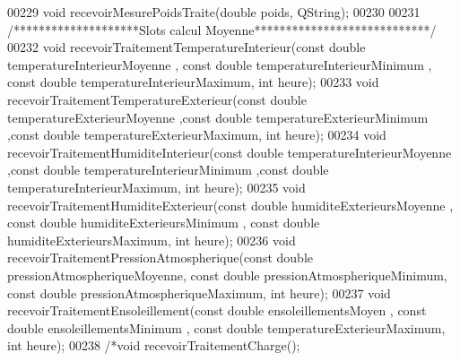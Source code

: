 \begin{DoxyCode}
00229         \textcolor{keywordtype}{void} recevoirMesurePoidsTraite(\textcolor{keywordtype}{double} poids, QString);
00230 
00231         \textcolor{comment}{/********************Slots calcul Moyenne****************************/}
00232         \textcolor{keywordtype}{void} recevoirTraitementTemperatureInterieur(\textcolor{keyword}{const} \textcolor{keywordtype}{double} temperatureInterieurMoyenne , \textcolor{keyword}{const} \textcolor{keywordtype}{double}
       temperatureInterieurMinimum , \textcolor{keyword}{const} \textcolor{keywordtype}{double} temperatureInterieurMaximum, \textcolor{keywordtype}{int} heure);
00233         \textcolor{keywordtype}{void} recevoirTraitementTemperatureExterieur(\textcolor{keyword}{const} \textcolor{keywordtype}{double} temperatureExterieurMoyenne ,\textcolor{keyword}{const} \textcolor{keywordtype}{double} 
      temperatureExterieurMinimum ,\textcolor{keyword}{const} \textcolor{keywordtype}{double} temperatureExterieurMaximum, \textcolor{keywordtype}{int} heure);
00234         \textcolor{keywordtype}{void} recevoirTraitementHumiditeInterieur(\textcolor{keyword}{const} \textcolor{keywordtype}{double} temperatureInterieurMoyenne ,\textcolor{keyword}{const} \textcolor{keywordtype}{double} 
      temperatureInterieurMinimum ,\textcolor{keyword}{const} \textcolor{keywordtype}{double} temperatureInterieurMaximum, \textcolor{keywordtype}{int} heure);
00235         \textcolor{keywordtype}{void} recevoirTraitementHumiditeExterieur(\textcolor{keyword}{const} \textcolor{keywordtype}{double} humiditeExterieursMoyenne , \textcolor{keyword}{const} \textcolor{keywordtype}{double} 
      humiditeExterieursMinimum , \textcolor{keyword}{const} \textcolor{keywordtype}{double} humiditeExterieursMaximum, \textcolor{keywordtype}{int} heure);
00236         \textcolor{keywordtype}{void} recevoirTraitementPressionAtmospherique(\textcolor{keyword}{const} \textcolor{keywordtype}{double} pressionAtmospheriqueMoyenne, \textcolor{keyword}{const} \textcolor{keywordtype}{
      double} pressionAtmospheriqueMinimum, \textcolor{keyword}{const} \textcolor{keywordtype}{double} pressionAtmospheriqueMaximum, \textcolor{keywordtype}{int} heure);
00237         \textcolor{keywordtype}{void} recevoirTraitementEnsoleillement(\textcolor{keyword}{const} \textcolor{keywordtype}{double} ensoleillementsMoyen , \textcolor{keyword}{const} \textcolor{keywordtype}{double} 
      ensoleillementsMinimum , \textcolor{keyword}{const} \textcolor{keywordtype}{double} temperatureExterieurMaximum, \textcolor{keywordtype}{int} heure);
00238         \textcolor{comment}{/*void recevoirTraitementCharge();}

\end{DoxyCode}
